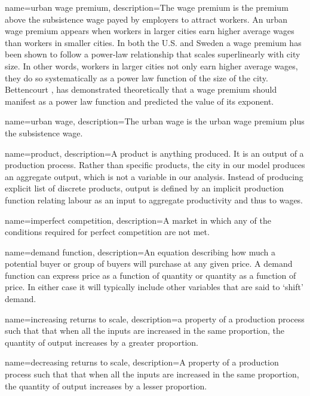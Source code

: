 {
name=urban wage premium,
description={The wage premium is the premium above the \gls{subsistence wage} payed by employers to attract workers. An urban wage premium appears when workers in larger cities earn higher average wages than workers in smaller cities. In both the U.S. and Sweden a wage premium has been shown to follow a power-law relationship that scales superlinearly with city size. In other words, workers in larger cities not only earn higher average wages, they do so systematically as a power law function of the size of the city. Bettencourt  \cite{bettencourtIntroductionUrbanScience2021}, has demonstrated theoretically that a wage premium should manifest as a power law function and predicted the value of its exponent.}
}

{
name=urban wage,
description={The \gls{urban wage} is the \gls{urban wage premium} plus the \gls{subsistence wage}.}
}

{
name=product,
description={A product is anything produced. It is an \gls{output} of a production process. %
Rather than specific products, the city in our model produces an aggregate output, which is not a variable in our analysis. Instead of producing explicit list of discrete products, output is defined by an implicit production function relating labour as an input to aggregate productivity and thus to wages. %
}
}

{
name=imperfect competition,
description={A market in which any of the conditions required for \gls{perfect competition} are not met.}
}

{
name=demand function,
description={An equation describing how much a potential buyer or group of buyers will purchase at any given price. A demand function can express price as a function of quantity or quantity as a function of price. In either case it will typically include other variables that are said to `shift' demand.}
}

{
name=increasing returns to scale,
description={a property of a production process  such that that when all the inputs are increased in the same proportion, the quantity of \gls{output} increases by a greater proportion.}
}

{
name=decreasing returns to scale,
description={A property of a production process such that that when all the inputs are increased in the same proportion, the quantity of \gls{output} increases by a lesser proportion.}
}

